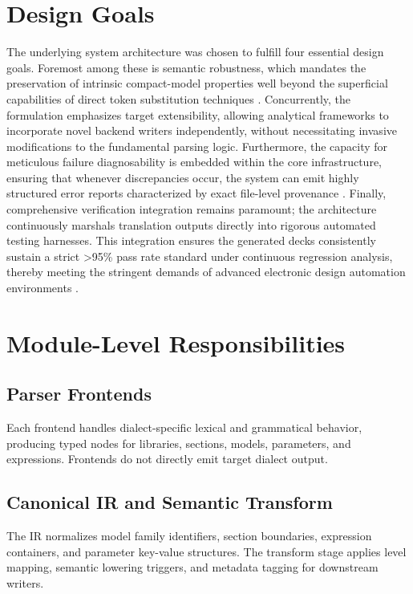 \documentclass[12pt,a4paper,oneside]{report}
\begin{document}
\section{Design Goals}
The underlying system architecture was chosen to fulfill four essential design goals. Foremost among these is semantic robustness, which mandates the preservation of intrinsic compact-model properties well beyond the superficial capabilities of direct token substitution techniques \cite{edacurry}. Concurrently, the formulation emphasizes target extensibility, allowing analytical frameworks to incorporate novel backend writers independently, without necessitating invasive modifications to the fundamental parsing logic. Furthermore, the capacity for meticulous failure diagnosability is embedded within the core infrastructure, ensuring that whenever discrepancies occur, the system can emit highly structured error reports characterized by exact file-level provenance \cite{translation_limits}. Finally, comprehensive verification integration remains paramount; the architecture continuously marshals translation outputs directly into rigorous automated testing harnesses. This integration ensures the generated decks consistently sustain a strict >95\% pass rate standard under continuous regression analysis, thereby meeting the stringent demands of advanced electronic design automation environments \cite{autospice,eda_standards}.

\section{Module-Level Responsibilities}

\subsection{Parser Frontends}
Each frontend handles dialect-specific lexical and grammatical behavior, producing typed nodes for libraries, sections, models, parameters, and expressions. Frontends do not directly emit target dialect output.

\subsection{Canonical IR and Semantic Transform}
The IR normalizes model family identifiers, section boundaries, expression containers, and parameter key-value structures. The transform stage applies level mapping, semantic lowering triggers, and metadata tagging for downstream writers.
\end{document}

